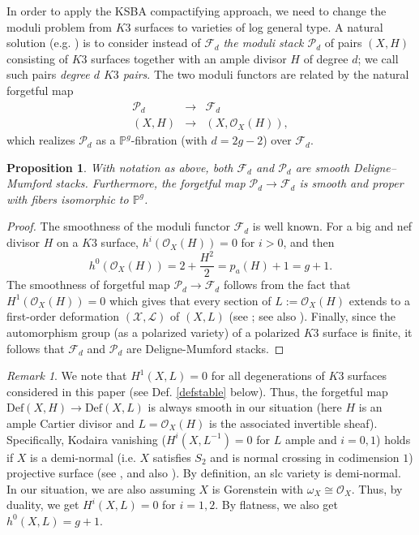 \documentclass{amsart}
\numberwithin{equation}{section}
\theoremstyle{plain}
\newtheorem{proposition}[equation]{Proposition}
\theoremstyle{remark}
\newtheorem{remark}[equation]{Remark}
\theoremstyle{definition}
\newcommand{\bP}{\mathbb{P}}
\newcommand{\calF}{\mathcal{F}}
\newcommand{\calO}{\mathcal{O}}
\newcommand{\calL}{\mathcal{L}}
\newcommand{\calP}{\mathcal{P}}
\newcommand{\sX}{\mathscr{X}}
\begin{document}
In order to apply the KSBA compactifying approach, we need to change the moduli problem from $K3$ surfaces to varieties of log general type. A natural solution (e.g. \cite[\S5.1]{alexeevpairs0}) is to consider instead of $\calF_d$ {\it the moduli stack $\calP_d$} of pairs $(X,H)$ consisting of $K3$ surfaces together with an ample divisor $H$ of degree $d$; we call such pairs {\it degree $d$ $K3$ pairs}. The two moduli functors are related by the  natural forgetful map 
\begin{eqnarray*}
\calP_d&\to& \calF_d\\
(X,H)&\to& (X,\calO_X(H)),
\end{eqnarray*} 
which realizes $\calP_d$ as  a $\bP^g$-fibration (with $d=2g-2$) over $\calF_d$. 
\begin{proposition}
With notation as above, both $\calF_d$ and $\calP_d$ are smooth Deligne--Mumford stacks. Furthermore, the forgetful map  $\calP_d\to \calF_d$ is smooth and proper with fibers isomorphic to $\bP^g$. 
\end{proposition}
\begin{proof}
The smoothness of the moduli functor $\calF_d$ is well known. For a big and nef divisor $H$ on a $K3$ surface, $h^i(\calO_X(H))=0$ for $i>0$, and then
$$h^0(\calO_X(H))=2+\frac{H^2}{2}=p_a(H)+1=g+1.$$ 
The smoothness of forgetful map $\calP_d\to\calF_d$ follows from the fact that $H^1(\calO_X(H))=0$ which gives that every section of $L:=\calO_X(H)$ extends to a first-order deformation $(\sX,\calL)$ of $(X,L)$ 
 (see \cite[Prop. 3.3.14]{sernesi}; see also \cite[\S5]{beauvillek3}). Finally, since the automorphism group (as a polarized variety) of a polarized $K3$ surface is finite, it follows that $\calF_d$ and $\calP_d$ are Deligne-Mumford stacks.
\end{proof}

\begin{remark}\label{remdef}
We note that $H^1(X,L)=0$ for all degenerations of $K3$ surfaces considered in this paper (see Def. \ref{defstable} below). Thus, the forgetful map $\mathrm{Def}(X,H)\to \mathrm{Def}(X,L)$ is always smooth in our situation (here $H$ is an ample Cartier divisor and $L=\calO_X(H)$ is the associated invertible sheaf). Specifically, Kodaira vanishing ($H^i(X,L^{-1})=0$ for $L$ ample and $i=0,1$) holds if  $X$ is a demi-normal  (i.e. $X$ satisfies $S_2$ and is normal crossing in codimension $1$) projective surface (see \cite[Thm. 3.1]{arapura}, and also \cite{kovacs}). By definition, an slc variety is demi-normal. In our situation, we are also assuming $X$ is Gorenstein with $\omega_X\cong \calO_X$. Thus, by duality, we get $H^i(X,L)=0$ for $i=1,2$. By flatness, we also get $h^0(X,L)=g+1$.
\end{remark}
\end{document}
